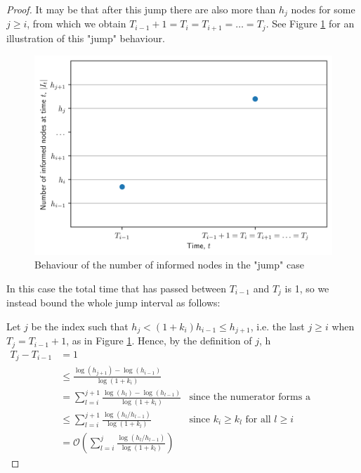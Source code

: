 \begin{proof}
	It may be that after this jump there are also more than $h_j$ nodes for some $j \geq i$, 
	from which we obtain $T_{i-1} + 1 = T_i = T_{i+1} = \dots = T_j$. See Figure \ref{fig:floodingJump} for an illustration of this "jump" behaviour. 
	\begin{figure}[h]
		\centering
		\includegraphics[width=1\textwidth]{./figures/flooding_jump.png}
		\caption{Behaviour of the number of informed nodes in the "jump" case}
		\label{fig:floodingJump}
	\end{figure}
	In this case the total time that has passed between $T_{i-1}$ and $T_j$ is 1, so we instead bound the whole jump interval as follows:
	
	Let $j$ be the index such that $h_j < (1+k_i)h_{i-1} \leq h_{j+1}$, i.e. the last $j \geq i$ when $T_j = T_{i-1} + 1$, as in Figure \ref{fig:floodingJump}. %
	Hence, by the definition of $j$, h
	\begin{align*}
		T_j - T_{i-1} &=1 \\ 
		&\leq \frac{\log (h_{j+1}) - \log(h_{i-1})}{\log(1+k_i) } \\
		& =\sum_{l=i}^{j+1} \frac{\log (h_{l}) - \log(h_{l-1})}{\log(1+k_i) } & \text{since the numerator forms a telescoping sum} \\
		& \leq \sum_{l=i}^{j+1} \frac{\log (h_{l}/h_{l-1})}{\log(1+k_l) } & \text{since } k_i \geq k_l \text{ for all } l \geq i \\
		& = \mathcal{O}\left(\sum_{l=i}^j \frac{\log (h_{l}/h_{l-1})}{\log(1+k_l) }\right)
 	\end{align*}


\end{proof}
